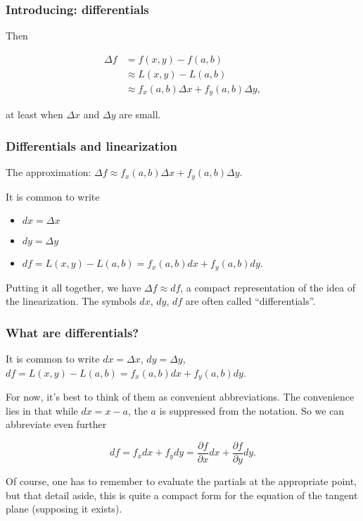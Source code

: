\documentclass[11pt,ignorenonframetext,]{beamer}
\begin{document}
\begin{frame}\frametitle{Introducing: differentials}

Then

\begin{align*}
\Delta f &= f(x,y) - f(a,b) \\
         & \approx L(x,y) - L(a, b) \\
         & \approx f_x(a,b)\Delta x + f_y(a,b) \Delta y, 
\end{align*}

at least when $\Delta x$ and $\Delta y$ are small.

\end{frame}

\begin{frame}\frametitle{Differentials and linearization}

The approximation:
$\Delta f \approx f_x(a,b) \Delta x + f_y(a,b) \Delta y$.

It is common to write

\begin{itemize}
\itemsep1pt\parskip0pt
\item
  $dx = \Delta x$
\item
  $dy = \Delta y$
\item
  $df = L(x,y) - L(a,b) = f_x(a,b) dx + f_y(a,b) dy$.
\end{itemize}

Putting it all together, we have $\Delta f \approx df$, a compact
representation of the idea of the linearization. The symbols $dx$, $dy$,
$df$ are often called ``differentials''.

\end{frame}

\begin{frame}\frametitle{What are differentials?}

It is common to write $dx = \Delta x$, $dy = \Delta y$,
$df = L(x,y) - L(a,b) = f_x(a,b) dx + f_y(a,b) dy$.

For now, it's best to think of them as convenient abbreviations. The
convenience lies in that while $dx = x-a$, the $a$ is suppressed from
the notation. So we can abbreviate even further

\[ df = f_x dx + f_y dy = \frac{\partial f}{\partial x} dx + \frac{\partial f}{\partial y} dy. \]

Of course, one has to remember to evaluate the partials at the
appropriate point, but that detail aside, this is quite a compact form
for the equation of the tangent plane (supposing it exists).

\end{frame}
\end{document}
